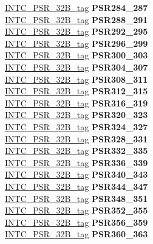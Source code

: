 \begin{DoxyCompactItemize}
\begin{tabbing}
\>\>\mbox{\hyperlink{unionINTC__PSR__32B__tag}{INTC\_PSR\_32B\_tag}} {\bfseries PSR284\_287}\\
\>\>\mbox{\hyperlink{unionINTC__PSR__32B__tag}{INTC\_PSR\_32B\_tag}} {\bfseries PSR288\_291}\\
\>\>\mbox{\hyperlink{unionINTC__PSR__32B__tag}{INTC\_PSR\_32B\_tag}} {\bfseries PSR292\_295}\\
\>\>\mbox{\hyperlink{unionINTC__PSR__32B__tag}{INTC\_PSR\_32B\_tag}} {\bfseries PSR296\_299}\\
\>\>\mbox{\hyperlink{unionINTC__PSR__32B__tag}{INTC\_PSR\_32B\_tag}} {\bfseries PSR300\_303}\\
\>\>\mbox{\hyperlink{unionINTC__PSR__32B__tag}{INTC\_PSR\_32B\_tag}} {\bfseries PSR304\_307}\\
\>\>\mbox{\hyperlink{unionINTC__PSR__32B__tag}{INTC\_PSR\_32B\_tag}} {\bfseries PSR308\_311}\\
\>\>\mbox{\hyperlink{unionINTC__PSR__32B__tag}{INTC\_PSR\_32B\_tag}} {\bfseries PSR312\_315}\\
\>\>\mbox{\hyperlink{unionINTC__PSR__32B__tag}{INTC\_PSR\_32B\_tag}} {\bfseries PSR316\_319}\\
\>\>\mbox{\hyperlink{unionINTC__PSR__32B__tag}{INTC\_PSR\_32B\_tag}} {\bfseries PSR320\_323}\\
\>\>\mbox{\hyperlink{unionINTC__PSR__32B__tag}{INTC\_PSR\_32B\_tag}} {\bfseries PSR324\_327}\\
\>\>\mbox{\hyperlink{unionINTC__PSR__32B__tag}{INTC\_PSR\_32B\_tag}} {\bfseries PSR328\_331}\\
\>\>\mbox{\hyperlink{unionINTC__PSR__32B__tag}{INTC\_PSR\_32B\_tag}} {\bfseries PSR332\_335}\\
\>\>\mbox{\hyperlink{unionINTC__PSR__32B__tag}{INTC\_PSR\_32B\_tag}} {\bfseries PSR336\_339}\\
\>\>\mbox{\hyperlink{unionINTC__PSR__32B__tag}{INTC\_PSR\_32B\_tag}} {\bfseries PSR340\_343}\\
\>\>\mbox{\hyperlink{unionINTC__PSR__32B__tag}{INTC\_PSR\_32B\_tag}} {\bfseries PSR344\_347}\\
\>\>\mbox{\hyperlink{unionINTC__PSR__32B__tag}{INTC\_PSR\_32B\_tag}} {\bfseries PSR348\_351}\\
\>\>\mbox{\hyperlink{unionINTC__PSR__32B__tag}{INTC\_PSR\_32B\_tag}} {\bfseries PSR352\_355}\\
\>\>\mbox{\hyperlink{unionINTC__PSR__32B__tag}{INTC\_PSR\_32B\_tag}} {\bfseries PSR356\_359}\\
\>\>\mbox{\hyperlink{unionINTC__PSR__32B__tag}{INTC\_PSR\_32B\_tag}} {\bfseries PSR360\_363}\\

\end{tabbing}
\end{DoxyCompactItemize}
